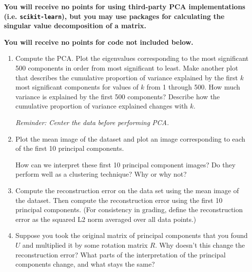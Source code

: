 \documentclass[submit]{harvardml}
\begin{document}
\begin{problem}
{\bfseries You will receive no points for using third-party PCA implementations (i.e. {\normalfont \texttt{scikit-learn}}), but you may use packages for calculating the singular value decomposition of a matrix.}

{\bfseries You will receive no points for code not included below.}
\begin{enumerate}

\item Compute the PCA. Plot the eigenvalues corresponding to the most
  significant 500 components in order from most significant to
  least. Make another plot that describes the cumulative proportion of
  variance explained by the first $k$ most significant components for
  values of $k$ from 1 through 500.  How much variance is explained by
  the first 500 components?  Describe how the cumulative proportion of
  variance explained changes with $k$. 
  
  \textit{Reminder: Center the data before performing PCA.}

\item Plot the mean image of the dataset and plot an image corresponding to each of the first 10 principal components. 

How can we interpret these first 10 principal component images? Do they perform well as a clustering technique? Why or why not?


\item Compute the reconstruction error on the data set using the mean image of the dataset.  Then compute the reconstruction error using the first 10 principal components. (For consistency in grading, define the reconstruction error as the squared L2 norm averaged over all data points.)

\item Suppose you took the original matrix of principal components
  that you found $U$ and multiplied it by some rotation matrix $R$.
  Why doesn't this change the reconstruction error?  What parts of the interpretation of the principal components change, and what stays the same?


\end{enumerate}
\end{problem}
\end{document}
